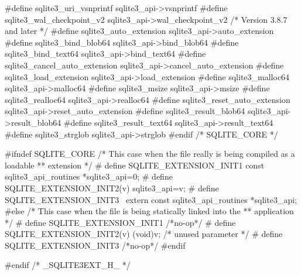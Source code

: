 \begin{Codex}[label=sqlite3ext.h,numbers=left]
#define sqlite3_uri_vsnprintf          sqlite3_api->vsnprintf
#define sqlite3_wal_checkpoint_v2      sqlite3_api->wal_checkpoint_v2
/* Version 3.8.7 and later */
#define sqlite3_auto_extension         sqlite3_api->auto_extension
#define sqlite3_bind_blob64            sqlite3_api->bind_blob64
#define sqlite3_bind_text64            sqlite3_api->bind_text64
#define sqlite3_cancel_auto_extension  sqlite3_api->cancel_auto_extension
#define sqlite3_load_extension         sqlite3_api->load_extension
#define sqlite3_malloc64               sqlite3_api->malloc64
#define sqlite3_msize                  sqlite3_api->msize
#define sqlite3_realloc64              sqlite3_api->realloc64
#define sqlite3_reset_auto_extension   sqlite3_api->reset_auto_extension
#define sqlite3_result_blob64          sqlite3_api->result_blob64
#define sqlite3_result_text64          sqlite3_api->result_text64
#define sqlite3_strglob                sqlite3_api->strglob
#endif /* SQLITE_CORE */

#ifndef SQLITE_CORE
  /* This case when the file really is being compiled as a loadable 
  ** extension */
# define SQLITE_EXTENSION_INIT1     const sqlite3_api_routines *sqlite3_api=0;
# define SQLITE_EXTENSION_INIT2(v)  sqlite3_api=v;
# define SQLITE_EXTENSION_INIT3     \
    extern const sqlite3_api_routines *sqlite3_api;
#else
  /* This case when the file is being statically linked into the 
  ** application */
# define SQLITE_EXTENSION_INIT1     /*no-op*/
# define SQLITE_EXTENSION_INIT2(v)  (void)v; /* unused parameter */
# define SQLITE_EXTENSION_INIT3     /*no-op*/
#endif

#endif /* _SQLITE3EXT_H_ */
\end{Codex}
